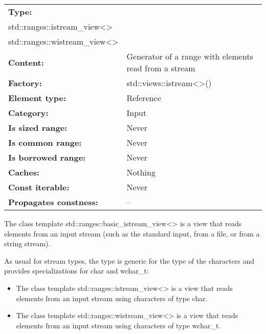 \begin{longtable}[c]{|l|l|}
\hline
\textbf{Type:} &
\begin{tabular}[c]{@{}l@{}}std::ranges::basic\_istream\_view\textless{}\textgreater\\ std::ranges::istream\_view\textless{}\textgreater\\ std::ranges::wistream\_view\textless{}\textgreater{}\end{tabular} \\ \hline
\endfirsthead
%
\endhead
%
\textbf{Content:}              & Generator of a range with elements read from a stream \\ \hline
\textbf{Factory:}              & std::views::istream\textless{}\textgreater{}()        \\ \hline
\textbf{Element type:}         & Reference                                             \\ \hline
\textbf{Category:}             & Input                                                 \\ \hline
\textbf{Is sized range:}       & Never                                                 \\ \hline
\textbf{Is common range:}      & Never                                                 \\ \hline
\textbf{Is borrowed range:}    & Never                                                 \\ \hline
\textbf{Caches:}               & Nothing                                               \\ \hline
\textbf{Const iterable:}       & Never                                                 \\ \hline
\textbf{Propagates constness:} & --                                                    \\ \hline
\end{longtable}

The class template std::ranges::basic\_istream\_view<> is a view that reads elements from an input stream (such as the standard input, from a file, or from a string stream).

As usual for stream types, the type is generic for the type of the characters and provides specializations for char and wchar\_t:

\begin{itemize}
\item
The class template std::ranges::istream\_view<> is a view that reads elements from an input stream using characters of type char.

\item
The class template std::ranges::wistream\_view<> is a view that reads elements from an input stream using characters of type wchar\_t.
\end{itemize}

